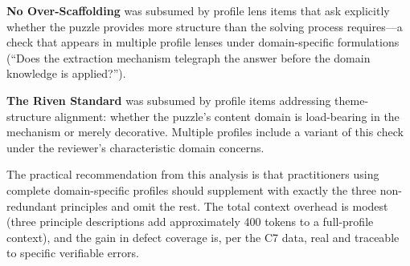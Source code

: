 \textbf{No Over-Scaffolding} was subsumed by profile lens items that ask explicitly whether the puzzle provides more structure than the solving process requires---a check that appears in multiple profile lenses under domain-specific formulations (``Does the extraction mechanism telegraph the answer before the domain knowledge is applied?'').

\textbf{The Riven Standard} was subsumed by profile items addressing theme-structure alignment: whether the puzzle's content domain is load-bearing in the mechanism or merely decorative. Multiple profiles include a variant of this check under the reviewer's characteristic domain concerns.

The practical recommendation from this analysis is that practitioners using complete domain-specific profiles should supplement with exactly the three non-redundant principles and omit the rest. The total context overhead is modest (three principle descriptions add approximately 400 tokens to a full-profile context), and the gain in defect coverage is, per the C7 data, real and traceable to specific verifiable errors.
